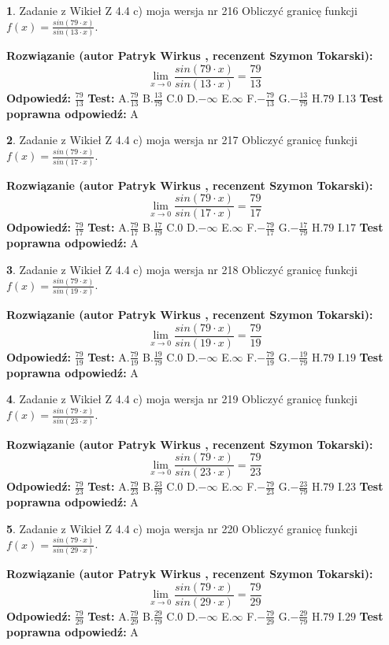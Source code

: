 \documentclass[12pt, a4paper]{article}
\theoremstyle{definition} %
\newtheorem{zad}{}
\newcommand{\zadStart}[1]{\begin{zad}#1\newline}
\newcommand{\zadStop}{\end{zad}}
\newcommand{\rozwStart}[2]{\noindent \textbf{Rozwiązanie (autor #1 , recenzent #2): }\newline}
\newcommand{\rozwStop}{\newline}
\newcommand{\odpStart}{\noindent \textbf{Odpowiedź:}\newline}
\newcommand{\odpStop}{\newline}
\newcommand{\testStart}{\noindent \textbf{Test:}\newline}
\newcommand{\testStop}{\newline}
\newcommand{\kluczStart}{\noindent \textbf{Test poprawna odpowiedź:}\newline}
\newcommand{\kluczStop}{\newline}
\begin{document}
\zadStart{Zadanie z Wikieł Z 4.4 c) moja wersja nr 216}
Obliczyć granicę funkcji $f(x)=\frac{sin(79\cdot x)}{sin(13\cdot x)}$.
\zadStop
\rozwStart{Patryk Wirkus}{Szymon Tokarski}
$$\lim\limits_{x\to 0}\frac{sin(79\cdot x)}{sin(13\cdot x)}=
\frac{79}{13}$$
\rozwStop
\odpStart
$\frac{79}{13}$
\odpStop
\testStart
A.$\frac{79}{13}$
B.$\frac{13}{79}$
C.$0$
D.$-\infty$
E.$\infty$
F.$-\frac{79}{13}$
G.$-\frac{13}{79}$
H.$79$
I.$13$
\testStop
\kluczStart
A
\kluczStop



\zadStart{Zadanie z Wikieł Z 4.4 c) moja wersja nr 217}
Obliczyć granicę funkcji $f(x)=\frac{sin(79\cdot x)}{sin(17\cdot x)}$.
\zadStop
\rozwStart{Patryk Wirkus}{Szymon Tokarski}
$$\lim\limits_{x\to 0}\frac{sin(79\cdot x)}{sin(17\cdot x)}=
\frac{79}{17}$$
\rozwStop
\odpStart
$\frac{79}{17}$
\odpStop
\testStart
A.$\frac{79}{17}$
B.$\frac{17}{79}$
C.$0$
D.$-\infty$
E.$\infty$
F.$-\frac{79}{17}$
G.$-\frac{17}{79}$
H.$79$
I.$17$
\testStop
\kluczStart
A
\kluczStop



\zadStart{Zadanie z Wikieł Z 4.4 c) moja wersja nr 218}
Obliczyć granicę funkcji $f(x)=\frac{sin(79\cdot x)}{sin(19\cdot x)}$.
\zadStop
\rozwStart{Patryk Wirkus}{Szymon Tokarski}
$$\lim\limits_{x\to 0}\frac{sin(79\cdot x)}{sin(19\cdot x)}=
\frac{79}{19}$$
\rozwStop
\odpStart
$\frac{79}{19}$
\odpStop
\testStart
A.$\frac{79}{19}$
B.$\frac{19}{79}$
C.$0$
D.$-\infty$
E.$\infty$
F.$-\frac{79}{19}$
G.$-\frac{19}{79}$
H.$79$
I.$19$
\testStop
\kluczStart
A
\kluczStop



\zadStart{Zadanie z Wikieł Z 4.4 c) moja wersja nr 219}
Obliczyć granicę funkcji $f(x)=\frac{sin(79\cdot x)}{sin(23\cdot x)}$.
\zadStop
\rozwStart{Patryk Wirkus}{Szymon Tokarski}
$$\lim\limits_{x\to 0}\frac{sin(79\cdot x)}{sin(23\cdot x)}=
\frac{79}{23}$$
\rozwStop
\odpStart
$\frac{79}{23}$
\odpStop
\testStart
A.$\frac{79}{23}$
B.$\frac{23}{79}$
C.$0$
D.$-\infty$
E.$\infty$
F.$-\frac{79}{23}$
G.$-\frac{23}{79}$
H.$79$
I.$23$
\testStop
\kluczStart
A
\kluczStop



\zadStart{Zadanie z Wikieł Z 4.4 c) moja wersja nr 220}
Obliczyć granicę funkcji $f(x)=\frac{sin(79\cdot x)}{sin(29\cdot x)}$.
\zadStop
\rozwStart{Patryk Wirkus}{Szymon Tokarski}
$$\lim\limits_{x\to 0}\frac{sin(79\cdot x)}{sin(29\cdot x)}=
\frac{79}{29}$$
\rozwStop
\odpStart
$\frac{79}{29}$
\odpStop
\testStart
A.$\frac{79}{29}$
B.$\frac{29}{79}$
C.$0$
D.$-\infty$
E.$\infty$
F.$-\frac{79}{29}$
G.$-\frac{29}{79}$
H.$79$
I.$29$
\testStop
\kluczStart
A
\kluczStop
\end{document}
